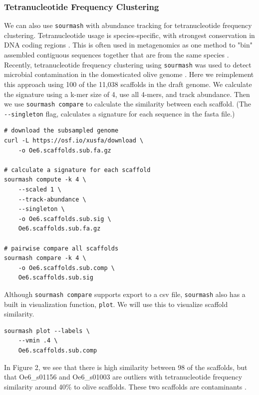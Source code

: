\documentclass[10pt,a4paper,twocolumn]{article}
\begin{document}
\subsubsection*{Tetranucleotide Frequency Clustering}
We can also use \lstinline{sourmash} with abundance tracking for tetranucleotide frequency clustering. Tetranucleotide usage is species-specific, with strongest conservation in DNA coding regions \cite{Pride2003}. This is often used in metagenomics as one method to "bin" assembled contiguous sequences together that are from the same species \cite{Albertsen2013}. Recently, tetranucleotide frequency clustering using \lstinline{sourmash} was used to detect microbial contamination in the domesticated olive genome \cite{Reiter2018}. Here we reimplement this approach using 100 of the 11,038 scaffolds in the draft genome. We calculate the signature using a k-mer size of 4, use all 4-mers, and track abundance. Then we use \lstinline{sourmash compare} to calculate the similarity between each scaffold. (The \lstinline{--singleton} flag, calculates a signature for each sequence in the fasta file.)

\begin{lstlisting}
# download the subsampled genome
curl -L https://osf.io/xusfa/download \
    -o Oe6.scaffolds.sub.fa.gz 
    
# calculate a signature for each scaffold
sourmash compute -k 4 \ 
    --scaled 1 \ 
    --track-abundance \ 
    --singleton \ 
    -o Oe6.scaffolds.sub.sig \ 
    Oe6.scaffolds.sub.fa.gz 

# pairwise compare all scaffolds
sourmash compare -k 4 \ 
    -o Oe6.scaffolds.sub.comp \ 
    Oe6.scaffolds.sub.sig
\end{lstlisting}

Although \lstinline{sourmash compare} supports export to a csv file, \lstinline{sourmash} also has a built in visualization function, \lstinline{plot}. We will use this to visualize scaffold similarity.

\begin{lstlisting}
sourmash plot --labels \ 
    --vmin .4 \ 
    Oe6.scaffolds.sub.comp 
\end{lstlisting}

In Figure 2, we see that there is high similarity between 98 of the scaffolds, but that Oe6\_s01156 and Oe6\_s01003 are outliers with tetranucleotide frequency similarity around 40\% to olive scaffolds. These two scaffolds are contaminants \cite{Reiter2018}. 
\end{document}
